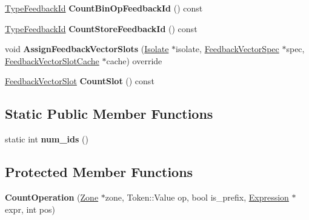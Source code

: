\begin{DoxyCompactItemize}
\item 
\hyperlink{classv8_1_1internal_1_1_type_feedback_id}{Type\+Feedback\+Id} {\bfseries Count\+Bin\+Op\+Feedback\+Id} () const \hypertarget{classv8_1_1internal_1_1_count_operation_af032709c76c72c91e6a64c8ac02ce158}{}\label{classv8_1_1internal_1_1_count_operation_af032709c76c72c91e6a64c8ac02ce158}

\item 
\hyperlink{classv8_1_1internal_1_1_type_feedback_id}{Type\+Feedback\+Id} {\bfseries Count\+Store\+Feedback\+Id} () const \hypertarget{classv8_1_1internal_1_1_count_operation_a150dcbc24eaa5bb8a09572563d9eb4d7}{}\label{classv8_1_1internal_1_1_count_operation_a150dcbc24eaa5bb8a09572563d9eb4d7}

\item 
void {\bfseries Assign\+Feedback\+Vector\+Slots} (\hyperlink{classv8_1_1internal_1_1_isolate}{Isolate} $\ast$isolate, \hyperlink{classv8_1_1internal_1_1_feedback_vector_spec}{Feedback\+Vector\+Spec} $\ast$spec, \hyperlink{classv8_1_1internal_1_1_feedback_vector_slot_cache}{Feedback\+Vector\+Slot\+Cache} $\ast$cache) override\hypertarget{classv8_1_1internal_1_1_count_operation_af3edef550a6e60115a35a46e8fb6215f}{}\label{classv8_1_1internal_1_1_count_operation_af3edef550a6e60115a35a46e8fb6215f}

\item 
\hyperlink{classv8_1_1internal_1_1_feedback_vector_slot}{Feedback\+Vector\+Slot} {\bfseries Count\+Slot} () const \hypertarget{classv8_1_1internal_1_1_count_operation_a200ca88ec0682e7913005309dd714d28}{}\label{classv8_1_1internal_1_1_count_operation_a200ca88ec0682e7913005309dd714d28}

\end{DoxyCompactItemize}
\subsection*{Static Public Member Functions}
\begin{DoxyCompactItemize}
\item 
static int {\bfseries num\+\_\+ids} ()\hypertarget{classv8_1_1internal_1_1_count_operation_a406f78a536eee765bc8ddc207c7f3f07}{}\label{classv8_1_1internal_1_1_count_operation_a406f78a536eee765bc8ddc207c7f3f07}

\end{DoxyCompactItemize}
\subsection*{Protected Member Functions}
\begin{DoxyCompactItemize}
\item 
{\bfseries Count\+Operation} (\hyperlink{classv8_1_1internal_1_1_zone}{Zone} $\ast$zone, Token\+::\+Value op, bool is\+\_\+prefix, \hyperlink{classv8_1_1internal_1_1_expression}{Expression} $\ast$expr, int pos)\hypertarget{classv8_1_1internal_1_1_count_operation_a982b81065ae05a2c80c0c031c3bfd674}{}\label{classv8_1_1internal_1_1_count_operation_a982b81065ae05a2c80c0c031c3bfd674}

\end{DoxyCompactItemize}
